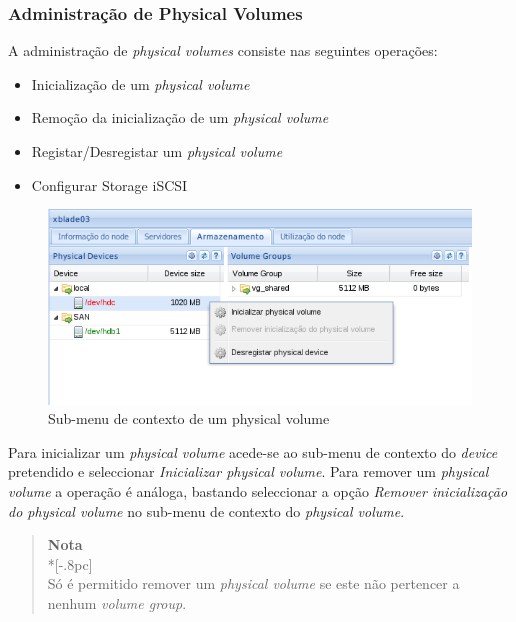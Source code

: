 
\subsubsection{Administração de Physical Volumes}
A administração de \emph{physical volumes} consiste nas seguintes operações:
\begin{itemize}
	\item Inicialização de um \emph{physical volume}
    \item Remoção da inicialização de um \emph{physical volume}
    \item Registar/Desregistar um \emph{physical volume}
    \item Configurar Storage iSCSI
\end{itemize}

\begin{figure}[H]
        \begin{center}
        \includegraphics[scale=0.45]{screenshots/node_storage_device_ctx.png}
        \caption{Sub-menu de contexto de um physical volume}
        \label{fig:storage_device_ctx}
        \end{center}
\end{figure}


Para inicializar um \emph{physical volume} acede-se ao sub-menu de contexto do \emph{device} pretendido e seleccionar \emph{Inicializar physical volume}. Para remover um \emph{physical volume} a operação é análoga, bastando seleccionar a opção \emph{Remover inicialização do physical volume} no sub-menu de contexto do \emph{physical volume}.

\begin{quote}
	{\large \bf Nota} \\*[-.8pc]
	\underline{\hspace{6in}} \\
	Só é permitido remover um \emph{physical volume} se este não pertencer a nenhum \emph{volume group}.
\end{quote}

